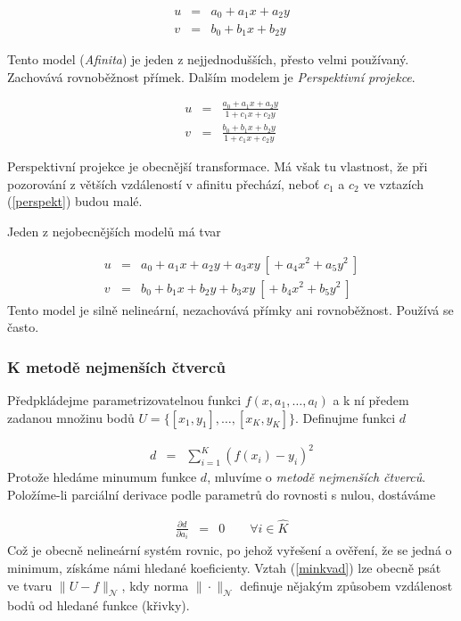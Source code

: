\begin{eqnarray}
u&=&a_0+a_1x+a_2y\nonumber\\
v&=&b_0+b_1x+b_2y\label{afinita}
\end{eqnarray}

Tento model ({\em Afinita}) je jeden z nejjednodušších, přesto velmi používaný. Zachovává rovnoběžnost přímek. 
Dalším modelem je {\em Perspektivní projekce}.

\begin{eqnarray}
u&=&\frac{a_0+a_1x+a_2y}{1+c_1x+c_2y}\nonumber\\
v&=&\frac{b_0+b_1x+b_2y}{1+c_1x+c_2y}\label{perspekt}
\end{eqnarray}

Perspektivní projekce je obecnější transformace. Má však tu vlastnost, že při pozorování z větších vzdáleností v afinitu
přechází, neboť $c_1$ a $c_2$ ve vztazích (\ref{perspekt}) budou malé.


Jeden z nejobecnějších modelů má tvar

\begin{eqnarray}
u&=&a_0+a_1x+a_2y+a_3xy\ [{}+a_4x^2+a_5y^2\ ]\nonumber\\
v&=&b_0+b_1x+b_2y+b_3xy\ [{}+b_4x^2+b_5y^2\ ]
\end{eqnarray}
Tento model je silně nelineární, nezachovává přímky ani rovnoběžnost. Používá se často.

\subsubsection{K metodě nejmenších čtverců}
Předpkládejme parametrizovatelnou funkci $f(x,a_1,\dots,a_l)$ a k ní předem zadanou množinu bodů $U=\{[x_1,y_1],\dots,[x_K,y_K]\}$.
Definujme funkci $d$ 

\begin{eqnarray}
d&=&\sum\limits_{i=1}^K (f(x_i)-y_i)^2\label{minkvad}
\end{eqnarray}
Protože hledáme minumum funkce $d$, mluvíme o {\em metodě nejmenších čtverců}. Položíme-li 
parciální derivace podle parametrů do rovnosti s
nulou, dostáváme

\begin{eqnarray}
\frac{\partial d}{\partial a_i}&=&0\qquad\forall i\in \hat{K}
\end{eqnarray}
Což je obecně nelineární systém rovnic, po jehož vyřešení a ověření, že se jedná o minimum,  získáme námi hledané koeficienty. Vztah (\ref{minkvad}) lze 
obecně psát ve tvaru $\|U-f\|_\mathcal{N}$, kdy norma $\|\cdot\|_\mathcal{N}$ definuje nějakým způsobem vzdálenost bodů
od hledané funkce (křivky).

